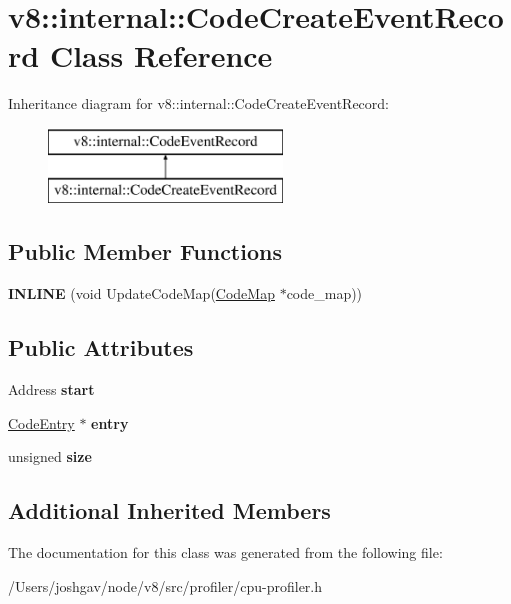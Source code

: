 \hypertarget{classv8_1_1internal_1_1_code_create_event_record}{}\section{v8\+:\+:internal\+:\+:Code\+Create\+Event\+Record Class Reference}
\label{classv8_1_1internal_1_1_code_create_event_record}
Inheritance diagram for v8\+:\+:internal\+:\+:Code\+Create\+Event\+Record\+:\begin{figure}[H]
\begin{center}
\leavevmode
\includegraphics[height=2.000000cm]{classv8_1_1internal_1_1_code_create_event_record}
\end{center}
\end{figure}
\subsection*{Public Member Functions}
\begin{DoxyCompactItemize}
\item 
{\bfseries I\+N\+L\+I\+NE} (void Update\+Code\+Map(\hyperlink{classv8_1_1internal_1_1_code_map}{Code\+Map} $\ast$code\+\_\+map))\hypertarget{classv8_1_1internal_1_1_code_create_event_record_ae675504aefc7776a63c37ca8749b389f}{}\label{classv8_1_1internal_1_1_code_create_event_record_ae675504aefc7776a63c37ca8749b389f}

\end{DoxyCompactItemize}
\subsection*{Public Attributes}
\begin{DoxyCompactItemize}
\item 
Address {\bfseries start}\hypertarget{classv8_1_1internal_1_1_code_create_event_record_af06d7e7b3f1a499b439eab478c1a9f83}{}\label{classv8_1_1internal_1_1_code_create_event_record_af06d7e7b3f1a499b439eab478c1a9f83}

\item 
\hyperlink{classv8_1_1internal_1_1_code_entry}{Code\+Entry} $\ast$ {\bfseries entry}\hypertarget{classv8_1_1internal_1_1_code_create_event_record_a958cee637aef8a57947e19850e8e75c9}{}\label{classv8_1_1internal_1_1_code_create_event_record_a958cee637aef8a57947e19850e8e75c9}

\item 
unsigned {\bfseries size}\hypertarget{classv8_1_1internal_1_1_code_create_event_record_a5135428e86169e1ec2e2a9dc4572e547}{}\label{classv8_1_1internal_1_1_code_create_event_record_a5135428e86169e1ec2e2a9dc4572e547}

\end{DoxyCompactItemize}
\subsection*{Additional Inherited Members}


The documentation for this class was generated from the following file\+:\begin{DoxyCompactItemize}
\item 
/\+Users/joshgav/node/v8/src/profiler/cpu-\/profiler.\+h\end{DoxyCompactItemize}

